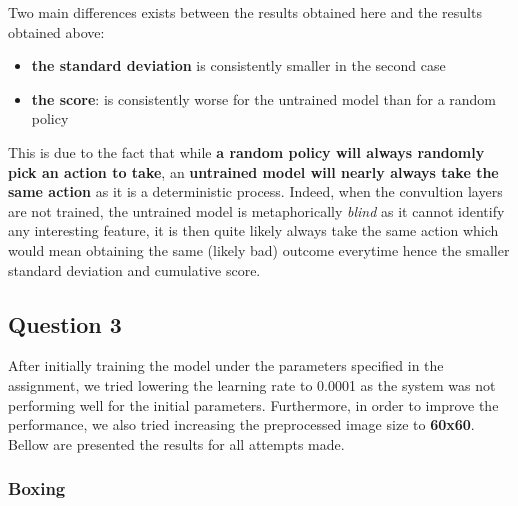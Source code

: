 \documentclass{report}
\begin{document}
Two main differences exists between the results obtained here and the results obtained above:
\begin{itemize}
	\item \textbf{the standard deviation}  is consistently smaller in the second case
	\item \textbf{the score}: is consistently worse for the untrained model than for a random policy
\end{itemize}

This is due to the fact that while \textbf{a random policy will always randomly pick an action to take}, an \textbf{untrained model will nearly always take the same action} as it is a deterministic process. Indeed, when the convultion layers are not trained, the untrained model is metaphorically \textit{blind} as it cannot identify any interesting feature, it is then quite likely always take the same action which would mean obtaining the same (likely bad) outcome everytime hence the smaller standard deviation and cumulative score.

\subsection*{Question 3}

After initially training the model under the parameters specified in the assignment, we tried lowering the learning rate to 0.0001 as the system was not performing well for the initial parameters. Furthermore, in order to improve the performance, we also tried increasing the preprocessed image size to \textbf{60x60}. Bellow are presented the results for all attempts made.  

\subsubsection*{Boxing}
\end{document}
